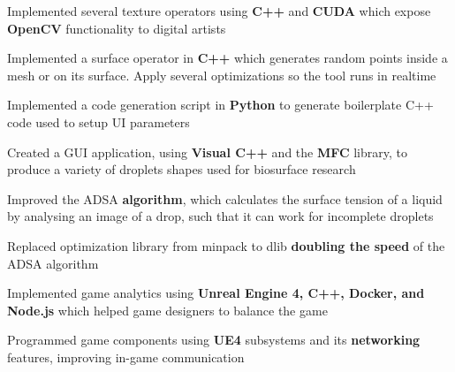 \documentclass[]{deedy-resume-openfont}
\begin{document}
\begin{minipage}[t]{0.66\textwidth}
\begin{tightemize}
    \item Implemented several texture operators using \textbf{C++} and \textbf{CUDA} which expose \textbf{OpenCV} functionality to digital artists
    \item Implemented a surface operator in \textbf{C++} which generates random points inside a mesh or on its surface. Apply several optimizations so the tool runs in realtime
    \item Implemented a code generation script in \textbf{Python} to generate boilerplate C++ code used to setup UI parameters
\end{tightemize}
\sectionsep

\begin{tightemize}
    \item Created a GUI application, using \textbf{Visual C++} and the \textbf{MFC} library, to produce a variety of droplets shapes used for biosurface research
    \item Improved the ADSA \textbf{algorithm}, which calculates the surface tension of a liquid by analysing an image of a drop, such that it can work for incomplete droplets
    \item Replaced optimization library from minpack to dlib \textbf{doubling the speed} of the ADSA algorithm
\end{tightemize}
\sectionsep

\begin{tightemize}
    \item Implemented game analytics using \textbf{Unreal Engine 4, C++, Docker, and Node.js} which helped game designers to balance the game
    \item Programmed game components using \textbf{UE4} subsystems and its \textbf{networking} features, improving in-game communication
\end{tightemize}


\end{minipage}
\end{document}
